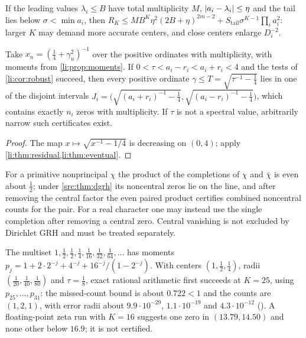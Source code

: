 If the leading values $\lambda_i\le B$ have total multiplicity $M$, $\lvert a_i-\lambda_i\rvert\le\eta$ and the
tail lies below $\sigma<\min a_i$, then
$R_K\le MB^K\eta^2(2B+\eta)^{2m-2}+S_{\mathrm{tail}}\sigma^{K-1}\prod_ia_i^2$: larger $K$ may demand more
accurate centers, and close centers enlarge $D_i^{-2}$.

\begin{corollary}\label{li:cor:zetacluster}
Take $x_n=(\frac14+\gamma_n^2)^{-1}$ over the positive ordinates with multiplicity, with moments from
\cref{li:prop:moments}. If $0<\tau<a_i-r_i<a_i+r_i<4$ and the tests of \cref{li:cor:robust} succeed,
then every positive ordinate $\gamma\le T=\sqrt{\tau^{-1}-\frac14}$ lies in one of the disjoint
intervals
$J_i=\bigl(\sqrt{(a_i+r_i)^{-1}-\frac14},\sqrt{(a_i-r_i)^{-1}-\frac14}\bigr)$, which contains exactly
$n_i$ zeros with multiplicity. If $\tau$ is not a spectral value, arbitrarily narrow such
certificates exist.
\end{corollary}

\begin{proof}
The map $x\mapsto\sqrt{x^{-1}-1/4}$ is decreasing on $(0,4)$; apply
\cref{li:thm:residual,li:thm:eventual}.
\end{proof}

For a primitive nonprincipal $\chi$ the product of the completions of $\chi$ and $\bar\chi$ is even
about $\frac12$; under \cref{src:thm:dgrh} its noncentral zeros lie on the line, and after removing
the central factor the even paired product certifies combined noncentral counts for the pair. For a
real character one may instead use the single completion after removing a central zero. Central
vanishing is not excluded by Dirichlet GRH and must be treated separately.

\begin{example}\label{li:ex:tail}
The multiset $1,\frac12,\frac12,\frac14,\frac1{16},\frac1{32},\frac1{64},\dots$ has moments
$p_j=1+2\cdot2^{-j}+4^{-j}+16^{-j}/(1-2^{-j})$. With centers $(1,\frac12,\frac14)$, radii
$(\frac1{20},\frac1{40},\frac1{80})$ and $\tau=\frac18$, exact rational arithmetic first succeeds at
$K=25$, using $p_{25},\dots,p_{31}$: the missed-count bound is about $0.722<1$ and the counts are
$(1,2,1)$, with error radii about $9.9\cdot10^{-29}$, $1.1\cdot10^{-19}$ and $4.3\cdot10^{-12}$
(). A floating-point zeta run
with $K=16$ suggests one zero in $(13.79,14.50)$ and none other below $16.9$; it is not certified.
\end{example}

